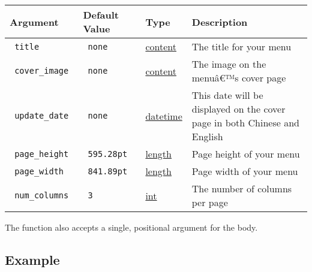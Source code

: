 \begin{longtable}[]{@{}llll@{}}
\toprule\noalign{}
Argument & Default Value & Type & Description \\
\midrule\noalign{}
\endhead
\bottomrule\noalign{}
\endlastfoot
\texttt{\ title\ } & \texttt{\ none\ } &
\href{https://typst.app/docs/reference/foundations/content/}{content} &
The title for your menu \\
\texttt{\ cover\_image\ } & \texttt{\ none\ } &
\href{https://typst.app/docs/reference/foundations/content/}{content} &
The image on the menuâ€™s cover page \\
\texttt{\ update\_date\ } & \texttt{\ none\ } &
\href{https://typst.app/docs/reference/foundations/datetime/}{datetime}
& This date will be displayed on the cover page in both Chinese and
English \\
\texttt{\ page\_height\ } & \texttt{\ 595.28pt\ } &
\href{https://typst.app/docs/reference/layout/length/}{length} & Page
height of your menu \\
\texttt{\ page\_width\ } & \texttt{\ 841.89pt\ } &
\href{https://typst.app/docs/reference/layout/length/}{length} & Page
width of your menu \\
\texttt{\ num\_columns\ } & \texttt{\ 3\ } &
\href{https://typst.app/docs/reference/foundations/int/}{int} & The
number of columns per page \\
\end{longtable}

The function also accepts a single, positional argument for the body.

\subsection{Example}\label{example}

\begin{Shaded}
\begin{Highlighting}[]

\NormalTok{)}


\end{Highlighting}
\end{Shaded}

